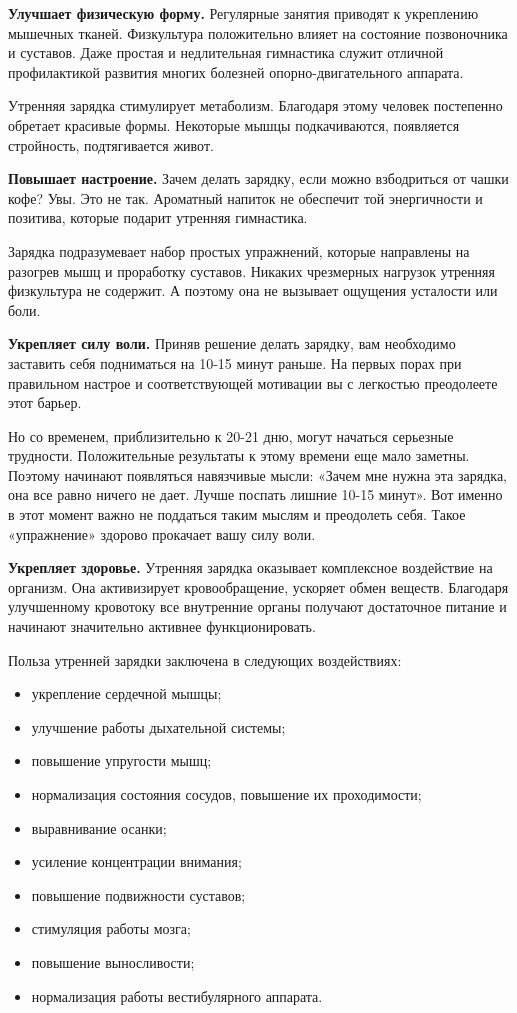 \textbf{Улучшает физическую форму.} Регулярные занятия приводят к укреплению мышечных тканей. Физкультура положительно влияет на состояние позвоночника и суставов. Даже простая и недлительная гимнастика служит отличной профилактикой развития многих болезней опорно-двигательного аппарата.

Утренняя зарядка стимулирует метаболизм. Благодаря этому человек постепенно обретает красивые формы. Некоторые мышцы подкачиваются, появляется стройность, подтягивается живот.

\textbf{Повышает настроение.} Зачем делать зарядку, если можно взбодриться от чашки кофе? Увы. Это не так. Ароматный напиток не обеспечит той энергичности и позитива, которые подарит утренняя гимнастика.

Зарядка подразумевает набор простых упражнений, которые направлены на разогрев мышц и проработку суставов. Никаких чрезмерных нагрузок утренняя физкультура не содержит. А поэтому она не вызывает ощущения усталости или боли.

\textbf{Укрепляет силу воли.}   Приняв решение делать зарядку, вам необходимо заставить себя подниматься на 10-15 минут раньше. На первых порах при правильном настрое и соответствующей мотивации вы с легкостью преодолеете этот барьер.

Но со временем, приблизительно к 20-21 дню, могут начаться серьезные трудности. Положительные результаты к этому времени еще мало заметны. Поэтому начинают появляться навязчивые мысли: «Зачем мне нужна эта зарядка, она все равно ничего не дает. Лучше поспать лишние 10-15 минут». Вот именно в этот момент важно не поддаться таким мыслям и преодолеть себя. Такое «упражнение» здорово прокачает вашу силу воли.

\textbf{Укрепляет здоровье.}
Утренняя зарядка оказывает комплексное воздействие на организм. Она активизирует кровообращение, ускоряет обмен веществ. Благодаря улучшенному кровотоку все внутренние органы получают достаточное питание и начинают значительно активнее функционировать.

Польза утренней зарядки заключена в следующих воздействиях:

\begin{itemize}
    \item укрепление сердечной мышцы;
    \item улучшение работы дыхательной системы;
    \item повышение упругости мышц;
    \item нормализация состояния сосудов, повышение их проходимости;
    \item выравнивание осанки;
    \item усиление концентрации внимания;
    \item повышение подвижности суставов;
    \item стимуляция работы мозга;
    \item повышение выносливости;
    \item нормализация работы вестибулярного аппарата.
\end{itemize}

